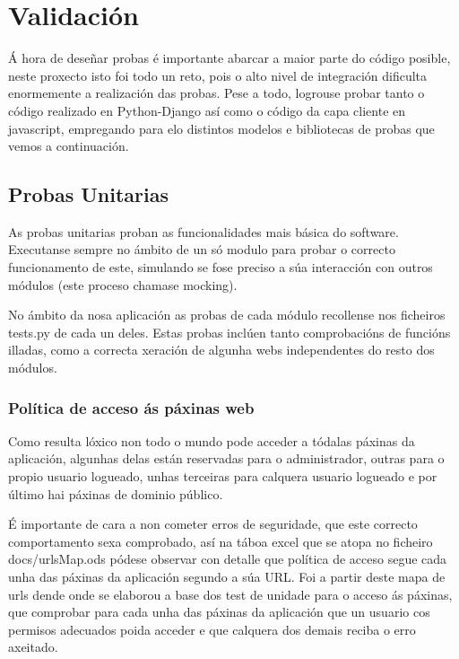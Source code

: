 \chapter{Validación}

Á hora de deseñar probas é importante abarcar a maior parte do código posible, neste proxecto isto
foi todo un reto, pois o alto nivel de integración dificulta enormemente a realización das probas.
Pese a todo, logrouse probar tanto o código realizado en Python-Django así como o código da capa 
cliente en javascript, empregando para elo distintos modelos e bibliotecas de probas que vemos a
continuación.

\section{Probas Unitarias}

    As probas unitarias proban as funcionalidades mais básica do software. Executanse sempre no 
    ámbito de un só modulo para probar o correcto funcionamento de este, simulando se fose preciso 
    a súa interacción con outros módulos (este proceso chamase mocking).
    
    No ámbito da nosa aplicación as probas de cada módulo recollense nos ficheiros tests.py de cada
    un deles. Estas probas inclúen tanto comprobacións de funcións illadas, como a correcta xeración
    de algunha webs independentes do resto dos módulos.
    
    \subsection{Política de acceso ás páxinas web}
        Como resulta lóxico non todo o mundo pode acceder a tódalas páxinas da aplicación, algunhas
        delas están reservadas para o administrador, outras para o propio usuario logueado, unhas
        terceiras para calquera usuario logueado e por último hai páxinas de dominio público.
        
        É importante de cara a non cometer erros de seguridade, que este correcto comportamento sexa
        comprobado, así na táboa excel que se atopa no ficheiro docs/urlsMap.ods pódese observar con
        detalle que política de acceso segue cada unha das páxinas da aplicación segundo a súa URL.
        Foi a partir deste mapa de urls dende onde se elaborou a base dos test de unidade para 
        o acceso ás páxinas, que comprobar para cada unha das páxinas da aplicación que un usuario
        cos permisos adecuados poida acceder e que calquera dos demais reciba o erro axeitado.
        
